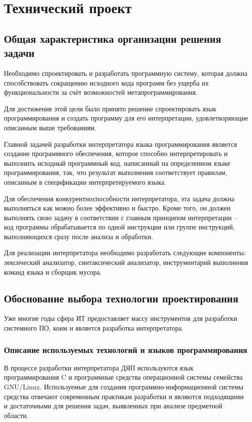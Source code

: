 \section{Технический проект}
\subsection{Общая характеристика организации решения задачи}

Необходимо спроектировать и разработать программную систему, которая должна способствовать сокращению исходного кода программ без ущерба их функциональности за счёт возможностей метапрограммирования.

Для достижения этой цели было принято решение спроектировать язык программирования и создать программу для его интерпретации, удовлетворяющие описанным выше требованиям.

Главной задачей разработки интерпретатора языка программирования является создание программного обеспечения, которое способно интерпретировать и выполнить исходный программный код, написанный на определенном языке программирования, так, что результат выполнения соответствует правилам, описанным в спецификации интерпретируемого языка.

Для обеспечения конкурентноспособности интерпретатора, эта задача должна выполняться как можно более эффективно и быстро. Кроме того, он должен выполнять свою задачу в соответствии с главным принципом интерпретации -- код программы обрабатывается по одной инструкции или группе инструкций, выполняющихся сразу после анализа и обработки. 

Для реализации интерпретатора необходимо разработать следующие компоненты: лексический анализатор, синтаксический анализатор, инструментарий выполнения команд языка и сборщик мусора.

\subsection{Обоснование выбора технологии проектирования}

Уже многие годы сфера ИТ предоставляет массу инструментов для разработки системного ПО, коим и является разработка интерпретатора.

\subsubsection{Описание используемых технологий и языков программирования}

В процессе разработки интерпретатора ДЯП используются язык программирования C и программные средства операционной системы семейства GNU/Linux. Используемые для создания программно-информационной системы средства отвечают современным практикам разработки и являются подходящими и достаточными для решения задач, выявленных при анализе предметной области.

